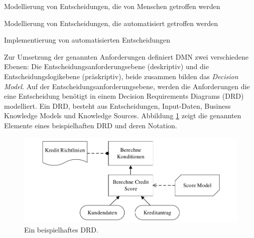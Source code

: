 \begin{enumerate*}
\item Modellierung von Entscheidungen, die von Menschen getroffen werden
\item Modellierung von Entscheidungen, die automatisiert getroffen werden 
\item Implementierung von automatisierten Entscheidungen    
\end{enumerate*}

Zur Umsetzung der genannten Anforderungen definiert DMN zwei verschiedene Ebenen: Die Entscheidungsanforderungsebene (deskriptiv) und die Entscheidungslogikebene (präskriptiv), beide zusammen bilden das \emph{Decision Model}. Auf der Entscheidungsanforderungsebene, werden die Anforderungen die eine Entscheidung benötigt in einem Decision Requirements Diagrams (DRD) modelliert. Ein DRD, besteht aus Entscheidungen, Input-Daten, Business Knowledge Models und Knowledge Sources. Abbildung \ref{fig:drd} \cite[vgl. S. 21]{OM16} zeigt die genannten Elemente eines beispielhaften DRD und deren Notation.     

\begin{figure}[ht]
\centering
\includegraphics{images/drd.pdf}
\caption{Ein beispielhaftes DRD.}
\label{fig:drd}
\end{figure}

